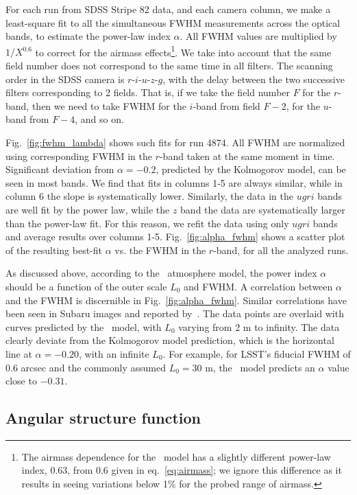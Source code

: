  
For each run from SDSS Stripe 82 data, and each camera column, we make
a least-square fit to all the simultaneous FWHM measurements across the optical bands, to
estimate the power-law index $\alpha$. All FWHM values are multiplied by $1/X^{0.6}$ to 
correct for the airmass effects\footnote{The airmass dependence for the \vk~model 
has a slightly different power-law index, 0.63, from 0.6 given in eq.~\ref{eq:airmass}; 
we ignore this difference as it results in seeing variations below 1\% for the probed 
range of airmass.}.
We take into account that the same field number does not correspond to the same
time in all filters. The scanning order in the SDSS camera is $r$-$i$-$u$-$z$-$g$, with the delay between the two 
successive filters corresponding to 2 fields. That is, if we take the field number $F$ for the $r$-band, then
we need to take FWHM for the $i$-band from field $F-2$, for the $u$-band
from $F-4$, and so on. 

Fig.~\ref{fig:fwhm_lambda} shows such fits for run 4874. All FWHM are normalized using 
corresponding FWHM in the $r$-band taken at the same moment in time. Significant deviation 
from $\alpha = -0.2$, predicted by the Kolmogorov model, can be seen in most bands.
We find that fits in columns 1-5 are always similar, while in column 6 the slope is 
systematically lower. Similarly, the data in the $ugri$ bands are well fit by the power law, 
while the $z$ band the data are systematically larger than the power-law fit. 
For this reason, we refit the data using only $ugri$ bands and average results
over columns 1-5.  Fig.~\ref{fig:alpha_fwhm} shows a scatter plot of the resulting
best-fit $\alpha$ vs. the FWHM in the $r$-band, for all the analyzed runs.
 
As discussed above, according to the \vk~atmosphere model, the
power index $\alpha$ should be a function of the outer scale $L_0$ and 
FWHM. A correlation between $\alpha$ and the FWHM is discernible in
Fig.~\ref{fig:alpha_fwhm}. Similar correlations have been seen in Subaru images 
and reported by~\cite{subaruSeeing2016}.
The data points are overlaid with curves predicted by the 
\vk~model, with $L_0$ varying from 2 m to infinity.
The data clearly deviate from the Kolmogorov model prediction, which is
the horizontal line at $\alpha = -0.20$, with an infinite $L_0$.
For example, for LSST's fiducial FWHM of 0.6 arcsec and the commonly assumed 
$L_0 = 30$ m, the \vk~model predicts an $\alpha$ value close to $-0.31$.



\subsection{Angular structure function} 

